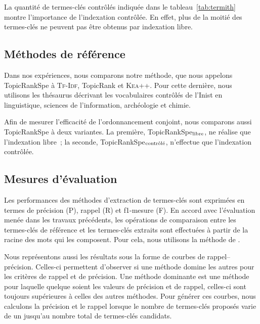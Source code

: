     La quantité de termes-clés contrôlés indiquée dans le
    tableau~\ref{tab:termith} montre l'importance de l'indexation contrôlée. En
    effet, plus de la moitié des termes-clés ne peuvent pas être obtenus par
    indexation libre.

  \subsection{Méthodes de référence}
  \label{subsec:main-domain_specific_keyphrase_annotation-supervised_automatic_keyphrase_annotation-evaluation-baselines}
    Dans nos expériences, nous comparons notre méthode, que nous appelons
    TopicRankSpe à \textsc{Tf-Idf}, TopicRank et \textsc{Kea++}. Pour cette
    dernière, nous utilisons les thésaurus décrivant les vocabulaires contrôlés
    de l'Inist en linguistique, sciences de l'information, archéologie et chimie.

    Afin de mesurer l'efficacité de l'ordonnancement conjoint, nous comparons
    aussi TopicRankSpe à deux variantes. La première,
    TopicRankSpe$_\textnormal{libre}$, ne réalise que l'indexation
    libre~; la seconde, TopicRankSpe$_\textnormal{contrôlé}$, n'effectue
    que l'indexation contrôlée.
  
  \subsection{Mesures d'évaluation}
  \label{subsec:main-domain_specific_keyphrase_annotation-supervised_automatic_keyphrase_annotation-evaluation-evaluation_measures}
    Les performances des méthodes d'extraction de termes-clés sont exprimées
    en termes de précision (P), rappel (R) et f1-mesure (F). En
    accord avec l'évaluation menée dans les travaux précédents, les
    opérations de comparaison entre les termes-clés de référence et les
    termes-clés extraits sont effectuées à partir de la racine des mots qui
    les composent. Pour cela, nous utilisons la méthode de
    .

    Nous représentons aussi les résultats sous la forme de courbes de
    rappel--précision. Celles-ci permettent d'observer si une méthode domine
    les autres pour les critères de rappel et de précision.
    Une méthode dominante est une méthode pour laquelle quelque soient les
    valeurs de précision et de rappel, celles-ci sont toujours supérieures à
    celles des autres méthodes.
    Pour générer ces courbes, nous calculons la précision et
    le rappel lorsque  le nombre de termes-clés proposés varie de
    un jusqu'au nombre total de termes-clés candidats.
  
